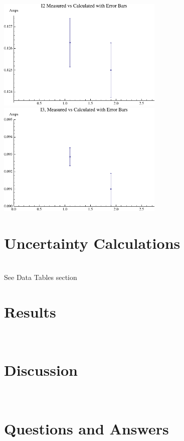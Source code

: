 \documentclass{article}
\begin{document}
			\includegraphics[width=300px]{lab7_graph2} \\
			
			\includegraphics[width=300px]{lab7_graph3} \\
			

\endgroup
\begingroup
	\section{Uncertainty Calculations}\hfill\\
		\let\clearpage\relax
			See Data Tables section
\endgroup
\begingroup
	\section{Results}\hfill\\
		\let\clearpage\relax
			
\endgroup
\begingroup
	\section{Discussion}\hfill\\
		\let\clearpage\relax
			
\endgroup
\begingroup
	\section{Questions and Answers }\hfill\\
		\let\clearpage\relax
			
\endgroup
\end{document}
